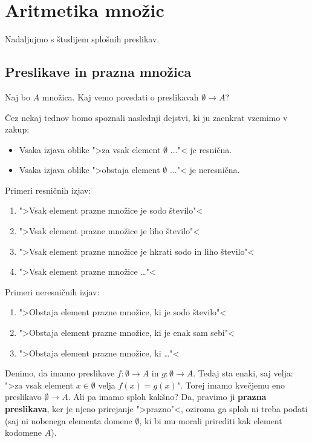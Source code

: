 \chapter{Aritmetika množic}

Nadaljujmo s študijem splošnih preslikav.

\section{Preslikave in prazna množica}

Naj bo $A$ množica. Kaj vemo povedati o preslikavah $\emptyset \to A$?

Čez nekaj tednov bomo spoznali naslednji dejstvi, ki ju zaenkrat vzemimo v zakup:

\begin{itemize}
\item Vsaka izjava oblike ">za vsak element $\emptyset$ ..."< je resnična.
\item Vsaka izjava oblike ">obstaja element $\emptyset$ ..."< je neresnična.
\end{itemize}

Primeri resničnih izjav:
%
\begin{enumerate}
\item ">Vsak element prazne množice je sodo število"<
\item ">Vsak element prazne množice je liho število"<
\item ">Vsak element prazne množice je hkrati sodo in liho število"<
\item ">Vsak element prazne množice \dots"<
\end{enumerate}

Primeri neresničnih izjav:
%
\begin{enumerate}
\item ">Obstaja element prazne množice, ki je sodo število"<
\item ">Obstaja element prazne množice, ki je enak sam sebi"<
\item ">Obstaja element prazne množice, ki \dots"<
\end{enumerate}
%
Denimo, da imamo preslikave $f :\emptyset \to A$ in $g : \emptyset \to A$. Tedaj sta enaki, saj velja: ">za vsak element $x \in \emptyset$ velja $f(x) = g(x)$".
Torej imamo kvečjemu eno preslikavo $\emptyset \to A$. Ali pa imamo sploh kakšno? Da, pravimo ji \textbf{prazna preslikava}, ker je njeno prirejanje ">prazno"<, oziroma ga sploh ni treba podati (saj ni nobenega elementa domene $\emptyset$, ki bi mu morali prirediti kak element kodomene $A$).

